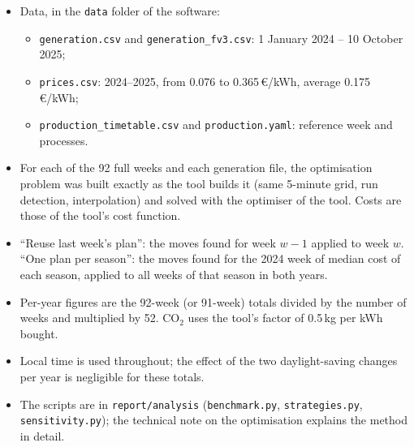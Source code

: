 \documentclass[10pt,a4paper]{scrartcl}
\begin{document}
  \begin{itemize}
    \item Data, in the \texttt{data} folder of the software:
      \begin{itemize}
        \item \texttt{generation.csv} and \texttt{generation\_fv3.csv}: 1 January 2024 -- 10 October 2025;
        \item \texttt{prices.csv}: 2024--2025, from 0.076 to 0.365\,\euro/kWh, average 0.175\,\euro/kWh;
        \item \texttt{production\_timetable.csv} and \texttt{production.yaml}: reference week and processes.
      \end{itemize}
    \item For each of the 92 full weeks and each generation file, the optimisation problem was built
      exactly as the tool builds it (same 5-minute grid, run detection, interpolation) and solved with
      the optimiser of the tool. Costs are those of the tool's cost function.
    \item ``Reuse last week's plan'': the moves found for week $w-1$ applied to week $w$.
      ``One plan per season'': the moves found for the 2024 week of median cost of each season,
      applied to all weeks of that season in both years.
    \item Per-year figures are the 92-week (or 91-week) totals divided by the number of weeks and
      multiplied by 52. CO$_2$ uses the tool's factor of 0.5\,kg per kWh bought.
    \item Local time is used throughout; the effect of the two daylight-saving changes per year is
      negligible for these totals.
    \item The scripts are in \texttt{report/analysis} (\texttt{benchmark.py}, \texttt{strategies.py},
      \texttt{sensitivity.py}); the technical note on the optimisation explains the method in detail.
  \end{itemize}

  
\end{document}

